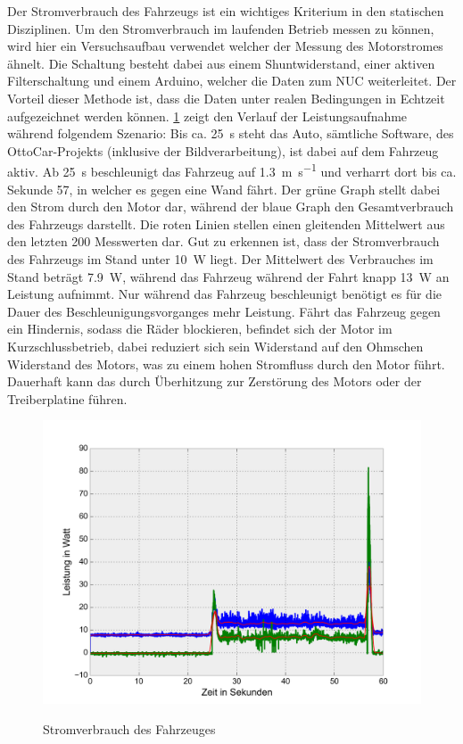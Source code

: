 Der Stromverbrauch des Fahrzeugs ist ein wichtiges Kriterium in den statischen Disziplinen. Um den Stromverbrauch im laufenden Betrieb messen zu können, wird hier ein Versuchsaufbau verwendet welcher der Messung des
Motorstromes ähnelt. Die Schaltung besteht dabei aus einem Shuntwiderstand, einer aktiven Filterschaltung und einem Arduino, welcher die Daten zum NUC weiterleitet. Der Vorteil dieser Methode ist, dass die Daten
unter realen Bedingungen in Echtzeit aufgezeichnet werden können. \cref{fig:power_consumption} zeigt den Verlauf der Leistungsaufnahme während folgendem Szenario: Bis ca. \SI{25}{\second} steht das Auto, sämtliche Software, des OttoCar-Projekts (inklusive
der Bildverarbeitung), ist dabei auf 
dem Fahrzeug aktiv. Ab \SI{25}{\second} beschleunigt das Fahrzeug auf \SI{1,3}{\metre\per\second} und verharrt dort bis ca. Sekunde 57, in welcher es gegen eine Wand fährt. Der grüne Graph stellt dabei den Strom durch den Motor dar, während
der blaue Graph den Gesamtverbrauch des Fahrzeugs darstellt. Die roten Linien stellen einen gleitenden Mittelwert aus den letzten 200 Messwerten dar. Gut zu erkennen ist, dass der Stromverbrauch des Fahrzeugs im Stand unter 
\SI{10}{\watt} liegt. Der Mittelwert des Verbrauches im Stand beträgt \SI{7,9}{\watt}, während das Fahrzeug während der Fahrt knapp \SI{13}{\watt} an Leistung aufnimmt. Nur während das Fahrzeug beschleunigt benötigt es für die Dauer
des Beschleunigungsvorganges mehr Leistung. Fährt das Fahrzeug gegen ein Hindernis, sodass die Räder blockieren, befindet sich der Motor im Kurzschlussbetrieb, dabei reduziert sich sein Widerstand auf den Ohmschen Widerstand
des Motors, was zu einem hohen Stromfluss durch den Motor führt. Dauerhaft kann das durch Überhitzung zur Zerstörung des Motors oder der Treiberplatine führen.

\begin{figure}[H]
\centering
\includegraphics[width=.8\textwidth]{Strom/Power.png}\\
\caption{Stromverbrauch des Fahrzeuges}%
\label{fig:power_consumption}
\end{figure}

